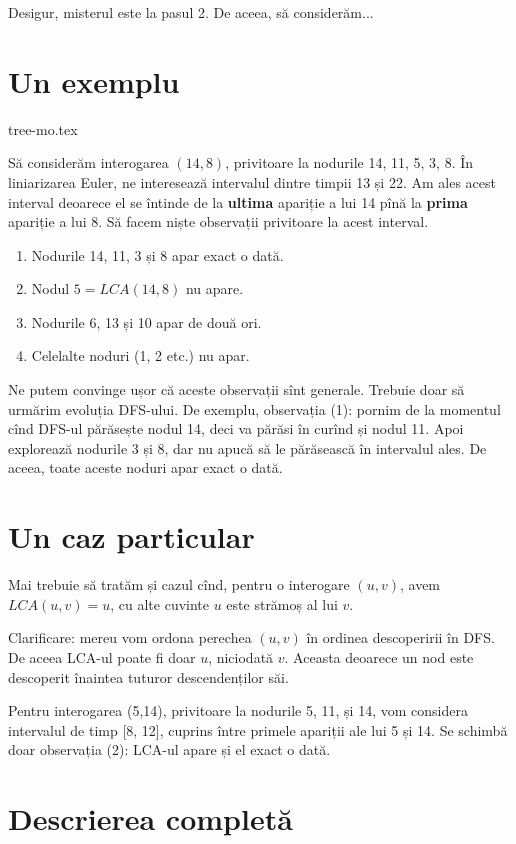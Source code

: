 \documentclass[../main.tex]{subfiles}
\begin{document}
Desigur, misterul este la pasul 2. De aceea, să considerăm...

\section{Un exemplu}

{tree-mo.tex}

Să considerăm interogarea $(14, 8)$, privitoare la nodurile 14, 11, 5, 3, 8. În liniarizarea Euler, ne interesează intervalul dintre timpii 13 și 22. Am ales acest interval deoarece el se întinde de la \textbf{ultima} apariție a lui 14 pînă la \textbf{prima} apariție a lui 8. Să facem niște observații privitoare la acest interval.

\begin{enumerate}
  \item Nodurile 14, 11, 3 și 8 apar exact o dată.
  \item Nodul $5 = LCA(14, 8)$ nu apare.
  \item Nodurile 6, 13 și 10 apar de două ori.
  \item Celelalte noduri (1,  2 etc.) nu apar.
\end{enumerate}

Ne putem convinge ușor că aceste observații sînt generale. Trebuie doar să urmărim evoluția DFS-ului. De exemplu, observația (1): pornim de la momentul cînd DFS-ul părăsește nodul 14, deci va părăsi în curînd și nodul 11. Apoi explorează nodurile 3 și 8, dar nu apucă să le părăsească în intervalul ales. De aceea, toate aceste noduri apar exact o dată.

\section{Un caz particular}

Mai trebuie să tratăm și cazul cînd, pentru o interogare $(u,v)$, avem $LCA(u,v) = u$, cu alte cuvinte $u$ este strămoș al lui $v$.

Clarificare: mereu vom ordona  perechea $(u,v)$ în ordinea descoperirii în DFS. De aceea LCA-ul poate fi doar $u$, niciodată $v$. Aceasta deoarece un nod este descoperit înaintea tuturor descendenților săi.

Pentru interogarea (5,14), privitoare la nodurile 5, 11, și 14, vom considera intervalul de timp [8, 12], cuprins între primele apariții ale lui 5 și 14. Se schimbă doar observația (2): LCA-ul apare și el exact o dată.

\section{Descrierea completă}
\end{document}
